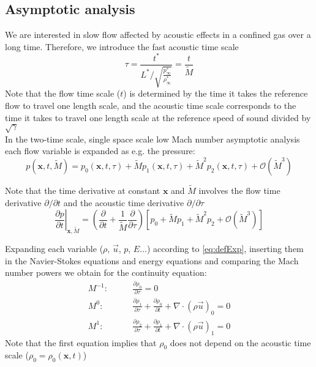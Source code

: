	
	\subsection{Asymptotic analysis}
	
	We are interested in slow flow affected by acoustic effects in a confined gas over a long time. Therefore, we introduce the fast acoustic time scale
	\begin{equation}
	\tau = \frac{t^*}{L^* / \sqrt{\frac{p^*_\infty}{\rho^*_\infty}}} = \frac{t}{\tilde{M}}
	\end{equation}
	Note that the flow time scale ($t$) is determined by the time it takes the reference flow to travel one length scale, and the acoustic time scale corresponds to the time it takes to travel one length scale at the reference speed of sound divided by $\sqrt{\gamma}$\\
	
	In the two-time scale, single space scale low Mach number asymptotic analysis each flow variable is expanded as e.g. the pressure:
	\begin{equation}\label{eq:defExp}
	p(\mathbf{x},t,\tilde{M}) = p_0(\mathbf{x},t,\tau) + \tilde{M} p_1(\mathbf{x},t,\tau) + \tilde{M}^2 p_2(\mathbf{x},t,\tau) + \mathcal{O}(\tilde{M}^3)
	\end{equation}
	
	Note that the time derivative at constant $\mathbf{x}$ and $\tilde{M}$ involves the flow time derivative $\partial/\partial t$ and the acoustic time derivative $\partial/\partial\tau$
	\begin{equation}
	\left.\frac{\partial p}{\partial t}\right|_{\mathbf{x},\tilde{M}} = 
	\left( \frac{\partial}{\partial t} + \frac{1}{\tilde{M}}\frac{\partial}{\partial \tau}\right)[p_0 + \tilde{M} p_1 + \tilde{M}^2 p_2 + \mathcal{O}(\tilde{M}^3)]
	\end{equation}
	
	Expanding each variable ($\rho$, $\vec{u}$, $p$, $E$...) according to \ref{eq:defExp}, inserting them in the Navier-Stokes equations and energy equations and comparing the Mach number powers we obtain for the continuity equation:
	\begin{align}
	M^{-1}:&\qquad \frac{\partial \rho_0}{\partial \tau} = 0\\
	M^{0}:&\qquad  \frac{\partial \rho_1}{\partial \tau} + \frac{\partial \rho_0}{\partial t}  + \nabla \cdot (\rho \vec{u})_0 = 0\\
	M^{1}:&\qquad  \frac{\partial \rho_2}{\partial \tau} + \frac{\partial \rho_1}{\partial t}  + \nabla \cdot (\rho \vec{u})_1 = 0
	\end{align}
	Note that the first equation implies that $\rho_0$ does not depend on the acoustic time scale ($\rho_0 = \rho_0(\mathbf{x}, t)$)
	

